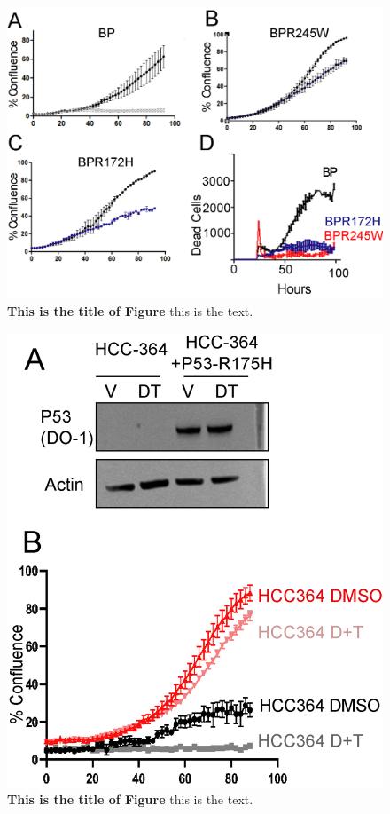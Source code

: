 \begin{figure}
\hypertarget{fig:04}{%
\centering
\includegraphics[width=1\textwidth,height=\textheight]{images/p537.png}
\caption{\textbf{This is the title of Figure} this is the text.}\label{fig:04}
}
\end{figure}

\begin{figure}
\hypertarget{fig:04}{%
\centering
\includegraphics[width=1\textwidth,height=\textheight]{images/p538.png}
\caption{\textbf{This is the title of Figure} this is the text.}\label{fig:04}
}
\end{figure}

